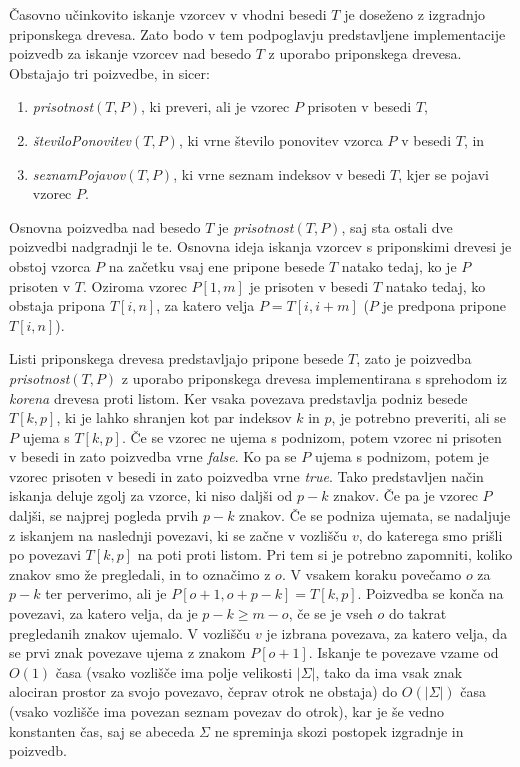 Časovno učinkovito iskanje vzorcev v vhodni besedi $T$ je doseženo z izgradnjo priponskega drevesa. Zato bodo v tem podpoglavju predstavljene implementacije poizvedb za iskanje vzorcev nad besedo $T$ z uporabo priponskega drevesa. Obstajajo tri poizvedbe, in sicer:
\begin{enumerate}
    \item \textit{prisotnost}$(T,P)$, ki preveri, ali je vzorec $P$ prisoten v besedi $T$,
    \item \textit{številoPonovitev}$(T,P)$, ki vrne število ponovitev vzorca $P$ v besedi $T$, in
    \item \textit{seznamPojavov}$(T,P)$, ki vrne seznam indeksov v besedi $T$, kjer se pojavi vzorec $P$.
\end{enumerate}

Osnovna poizvedba nad besedo $T$ je \textit{prisotnost}$(T,P)$, saj sta ostali dve poizvedbi nadgradnji le te. Osnovna ideja iskanja vzorcev s priponskimi drevesi je obstoj vzorca $P$ na začetku vsaj ene pripone besede $T$ natako tedaj, ko je $P$ prisoten v $T$. Oziroma vzorec $P[1,m]$ je prisoten v besedi $T$ natako tedaj, ko obstaja pripona $T[i,n]$, za katero velja $P=T[i,i+m]$ ($P$ je predpona pripone $T[i,n]$). 

Listi priponskega drevesa predstavljajo pripone besede $T$, zato je poizvedba \textit{prisotnost}$(T,P)$ z uporabo priponskega drevesa implementirana s sprehodom iz \textit{korena} drevesa proti listom. Ker vsaka povezava predstavlja podniz besede $T[k,p]$, ki je lahko shranjen kot par indeksov $k$ in $p$, je potrebno preveriti, ali se $P$ ujema s $T[k,p]$. Če se vzorec ne ujema s podnizom, potem vzorec ni prisoten v besedi in zato poizvedba vrne \textit{false}. Ko pa se $P$ ujema s podnizom, potem je vzorec prisoten v besedi in zato poizvedba vrne \textit{true}. Tako predstavljen način iskanja deluje zgolj za vzorce, ki niso daljši od $p-k$ znakov. Če pa je vzorec $P$ daljši, se najprej pogleda prvih $p-k$ znakov. Če se podniza ujemata, se nadaljuje z iskanjem na naslednji povezavi, ki se začne v vozlišču $v$, do katerega smo prišli po povezavi $T[k,p]$ na poti proti listom. Pri tem si je potrebno zapomniti, koliko znakov smo že pregledali, in to označimo z $o$. V vsakem koraku povečamo $o$ za $p-k$ ter perverimo, ali je $P[o+1,o+p-k]=T[k,p]$. Poizvedba se konča na povezavi, za katero velja, da je $p-k\ge m-o$, če se je vseh $o$ do takrat pregledanih znakov ujemalo. V vozlišču $v$ je izbrana povezava, za katero velja, da se prvi znak povezave ujema z znakom $P[o+1]$. Iskanje te povezave vzame od $O(1)$ časa (vsako vozlišče ima polje velikosti $|\Sigma|$, tako da ima vsak znak alociran prostor za svojo povezavo, čeprav otrok ne obstaja) do $O(|\Sigma|)$ časa (vsako vozlišče ima povezan seznam povezav do otrok), kar je še vedno konstanten čas, saj se abeceda $\Sigma$ ne spreminja skozi postopek izgradnje in poizvedb.

